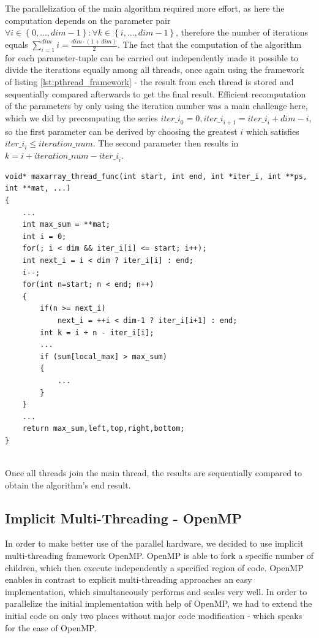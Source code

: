 \documentclass[conference]{IEEEtran}
\begin{document}
The parallelization of the main algorithm required more effort, as here the computation depends on the parameter pair $\forall i\in \left\lbrace 0,...,\mathit{dim}-1 \right\rbrace :\forall k\in \left\lbrace i,...,\mathit{dim}-1 \right\rbrace$, therefore the number of iterations equals $\sum^{\mathit{dim}}_{i=1}i=\frac{\mathit{dim}\cdot (1+\mathit{dim})}{2}$. The fact that the computation of the algorithm for each parameter-tuple can be carried out independently made it possible to divide the iterations equally among all threads, once again using the framework of listing \ref{lst:pthread_framework} - the result from each thread is stored and sequentially compared afterwards to get the final result. Efficient recomputation of the parameters by only using the iteration number was a main challenge here, which we did by precomputing the series $\mathit{iter\_i}_0=0, \mathit{iter\_i}_{i+1}=\mathit{iter\_i}_{i}+\mathit{dim}-i$, so the first parameter can be derived by choosing the greatest $i$ which satisfies $\mathit{iter\_i}_i\leq \mathit{iteration\_num}$. The second parameter then results in $k=i+\mathit{iteration\_num}-\mathit{iter\_i}_{i}$.

\begin{center}
   \begin{lstlisting}[captionpos=b, caption=pthread: Parallel Main Algorithm (simplified), label=lst:pthread_maincomp]
void* maxarray_thread_func(int start, int end, int *iter_i, int **ps, int **mat, ...)
{
	...
	int max_sum = **mat;
	int i = 0;
	for(; i < dim && iter_i[i] <= start; i++);
	int next_i = i < dim ? iter_i[i] : end;
	i--;
	for(int n=start; n < end; n++)
	{
		if(n >= next_i) 
			next_i = ++i < dim-1 ? iter_i[i+1] : end;
		int k = i + n - iter_i[i];
		...
		if (sum[local_max] > max_sum)
		{
			...
		}
	}
	...
	return max_sum,left,top,right,bottom;
}
        
   \end{lstlisting}
\end{center}

Once all threads join the main thread, the results are sequentially compared to obtain the algorithm's end result.

\subsection{Implicit Multi-Threading - OpenMP}
\label{sec:impl:openmp}

In order to make better use of the parallel hardware, we decided to use implicit multi-threading framework OpenMP. OpenMP is able to fork a specific number of children, which then execute independently a specified region of code. OpenMP enables in contrast to explicit multi-threading approaches an easy implementation, which simultaneously performs and scales very well. In order to parallelize the initial implementation with help of OpenMP, we had to extend the initial code on only two places without major code modification - which speaks for the ease of OpenMP. 
\end{document}
